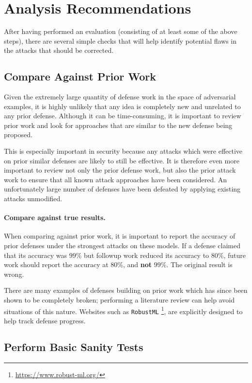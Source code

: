 \documentclass{article} %
\begin{document}
\section{Analysis Recommendations}
\label{sec:analysis}

After having performed an evaluation (consisting of at least 
some of the above
steps), there are several simple checks that will help
identify potential flaws in the attacks that should be corrected.

\subsection{Compare Against Prior Work}
\label{sec:priorwork}

Given the extremely large quantity of defense work in the space of
adversarial examples, it is highly unlikely that any idea is completely
new and unrelated to any prior defense.
%
Although it can be time-consuming, it is important to review prior
work and look for approaches that are similar to the new defense
being proposed.

This is especially important in security because any attacks which
were effective on prior similar defenses are likely to still
be effective.
%
It is therefore even more important to review not
only the prior defense work, but also the prior attack work to ensure
that all known attack approaches have been considered.
%
An unfortunately large number of defenses have been defeated by
applying existing attacks unmodified.

\paragraph{Compare against true results.}
%
When comparing against prior
work, it is important to report the accuracy of prior defenses under
the strongest attacks on these models.%
If a defense claimed that its
accuracy was $99\%$ but followup work reduced its accuracy to $80\%$,
future work should report the accuracy at $80\%$, and \textbf{not} $99\%$.
%
The original result is wrong.

There are many examples of defenses building on prior work which
has since been shown to be completely broken; performing a literature
review can help avoid situations of this nature. Websites such
as \texttt{RobustML}%
\footnote{\url{https://www.robust-ml.org/}},
are explicitly designed to help track defense progress.

\subsection{Perform Basic Sanity Tests}
\label{sec:sanitycheck}
\end{document}
